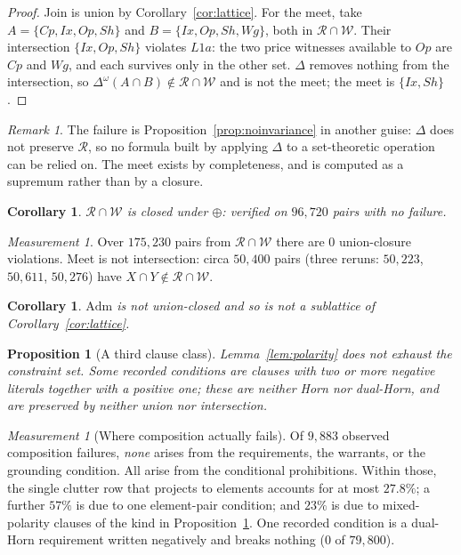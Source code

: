 \documentclass[11pt]{article}
\theoremstyle{definition}
\theoremstyle{plain}
\newtheorem{proposition}[definition]{Proposition}
\newtheorem{corollary}[definition]{Corollary}
\theoremstyle{remark}
\newtheorem{measurement}[definition]{Measurement}
\newtheorem{remark}[definition]{Remark}
\newcommand{\Adm}{\mathrm{Adm}}
\begin{document}
\begin{proof}
Join is union by Corollary~\ref{cor:lattice}. For the meet, take
$A = \{Cp,Ix,Op,Sh\}$ and $B = \{Ix,Op,Sh,Wg\}$, both in
$\mathcal{R} \cap \mathcal{W}$. Their intersection $\{Ix,Op,Sh\}$ violates $L1a$:
the two price witnesses available to $Op$ are $Cp$ and $Wg$, and each survives
only in the other set. $\Delta$ removes nothing from the intersection, so
$\Delta^{\omega}(A \cap B) \notin \mathcal{R} \cap \mathcal{W}$ and is not the
meet; the meet is $\{Ix,Sh\}$.
\end{proof}

\begin{remark}
The failure is Proposition~\ref{prop:noinvariance} in another guise: $\Delta$ does
not preserve $\mathcal{R}$, so no formula built by applying $\Delta$ to a
set-theoretic operation can be relied on. The meet exists by completeness, and is
computed as a supremum rather than by a closure.
\end{remark}

\begin{corollary}\label{cor:oplusclosed}
$\mathcal{R} \cap \mathcal{W}$ is closed under $\oplus$: verified on $96{,}720$
pairs with no failure.
\end{corollary}

\begin{measurement}\label{meas:latticeconf}
Over $175{,}230$ pairs from $\mathcal{R} \cap \mathcal{W}$ there are $0$
union-closure violations. Meet is not intersection: circa $50{,}400$ pairs (three reruns: $50{,}223$, $50{,}611$, $50{,}276$) have
$X \cap Y \notin \mathcal{R} \cap \mathcal{W}$.
\end{measurement}

\begin{corollary}\label{cor:admnotlattice}
$\Adm$ is not union-closed and so is not a sublattice of
Corollary~\ref{cor:lattice}.
\end{corollary}

\begin{proposition}[A third clause class]\label{prop:mixed}
Lemma~\ref{lem:polarity} does not exhaust the constraint set. Some recorded
conditions are clauses with two or more negative literals together with a
positive one; these are neither Horn nor dual-Horn, and are preserved by neither
union nor intersection.
\end{proposition}

\begin{measurement}[Where composition actually fails]\label{meas:whereitfails}
Of $9{,}883$ observed composition failures, \emph{none} arises from the
requirements, the warrants, or the grounding condition. All arise from the
conditional prohibitions. Within those, the single clutter row that projects to
elements accounts for at most $27.8\%$; a further $57\%$ is due to one
element-pair condition; and $23\%$ is due to mixed-polarity clauses of the kind in
Proposition~\ref{prop:mixed}. One recorded condition is a dual-Horn requirement
written negatively and breaks nothing ($0$ of $79{,}800$).
\end{measurement}
\end{document}
